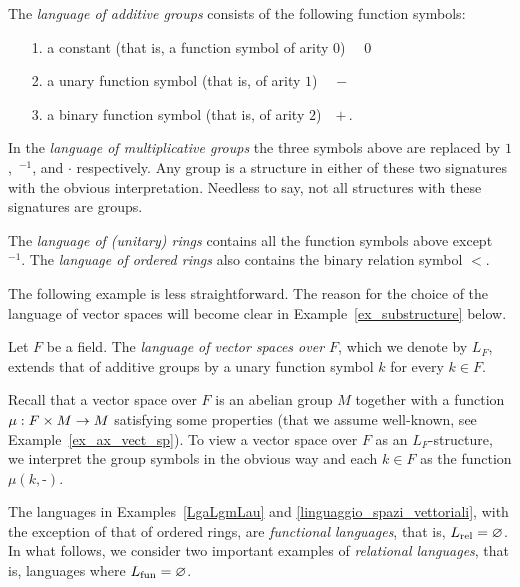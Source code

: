 \begin{example}\label{LgaLgmLau}
The \emph{language of additive groups\/} consists of the following function symbols:\nobreak
\begin{itemize}
\item[1.] a constant (that is, a function symbol of arity $0$) \ \  $0$
\item[2.] a unary function symbol (that is, of arity $1$) \ \   $-$
\item[3.] a binary function symbol (that is, of arity $2$)\ \  $+ \,$.
\end{itemize}
In the \emph{language of multiplicative groups\/} the three symbols above are replaced by $1$,~${}^{-1}$, and $\cdot$ respectively. Any group is a structure in either of these two signatures with the obvious interpretation. Needless to say, not all structures with these signatures are groups. 

The \emph{language of (unitary) rings\/} contains all the function symbols above except \ ${}^{-1}$. The  \emph{language of ordered rings\/} also contains the binary relation symbol $<$.\QED
\end{example}

The following example is less straightforward. The reason for the choice of the language of vector spaces will become clear in Example~\ref{ex_substructure} below.

\begin{example}\label{linguaggio_spazi_vettoriali}
Let $F$ be a field. The \emph{language of vector spaces over $F$\/}, which we denote by $L_F$, extends that of additive groups by a unary function symbol $k$ for every $k\in F$. 

Recall that a vector space over $F$ is an abelian group $M$ together with a function $\mu:F\times M\rightarrow M$ satisfying some properties (that we assume well-known, see Example~\ref{ex_ax_vect_sp}).
 To view a vector space over $F$ as an $L_F$-structure, we interpret the group symbols in the obvious way and each $k\in F$ as the function $\mu(k,\mbox{-})$.\QED
\end{example}

The languages in Examples~\ref{LgaLgmLau} and \ref{linguaggio_spazi_vettoriali}, with the exception of that of ordered rings, are \emph{functional languages}, that is, $L_{\rm rel}=\varnothing$. In what follows, we consider two important examples of \emph{relational languages\/}, that is, languages where $L_{\rm fun}=\varnothing$.

